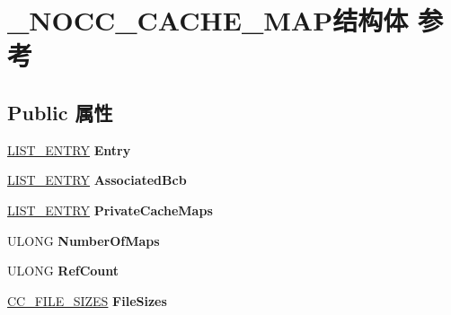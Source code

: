 \hypertarget{struct___n_o_c_c___c_a_c_h_e___m_a_p}{}\section{\+\_\+\+N\+O\+C\+C\+\_\+\+C\+A\+C\+H\+E\+\_\+\+M\+A\+P结构体 参考}
\label{struct___n_o_c_c___c_a_c_h_e___m_a_p}
\subsection*{Public 属性}
\begin{DoxyCompactItemize}
\item 
\mbox{\label{struct___n_o_c_c___c_a_c_h_e___m_a_p_a71ab92a38186544ad79e97781e9ecbda}} 
\hyperlink{struct___l_i_s_t___e_n_t_r_y}{L\+I\+S\+T\+\_\+\+E\+N\+T\+RY} {\bfseries Entry}
\item 
\mbox{\label{struct___n_o_c_c___c_a_c_h_e___m_a_p_af09b1347b81690c13797b5fc41b60cb1}} 
\hyperlink{struct___l_i_s_t___e_n_t_r_y}{L\+I\+S\+T\+\_\+\+E\+N\+T\+RY} {\bfseries Associated\+Bcb}
\item 
\mbox{\label{struct___n_o_c_c___c_a_c_h_e___m_a_p_ac738d2062c4c33e7d63e785c526eaed7}} 
\hyperlink{struct___l_i_s_t___e_n_t_r_y}{L\+I\+S\+T\+\_\+\+E\+N\+T\+RY} {\bfseries Private\+Cache\+Maps}
\item 
\mbox{\label{struct___n_o_c_c___c_a_c_h_e___m_a_p_a1c830813d95c608db8f7bbdaccee0db6}} 
U\+L\+O\+NG {\bfseries Number\+Of\+Maps}
\item 
\mbox{\label{struct___n_o_c_c___c_a_c_h_e___m_a_p_a57a12878226fdd675367fe0488aaa815}} 
U\+L\+O\+NG {\bfseries Ref\+Count}
\item 
\mbox{\label{struct___n_o_c_c___c_a_c_h_e___m_a_p_a9d834db9b3c0f13c934faa1e764ab338}} 
\hyperlink{struct___c_c___f_i_l_e___s_i_z_e_s}{C\+C\+\_\+\+F\+I\+L\+E\+\_\+\+S\+I\+Z\+ES} {\bfseries File\+Sizes}
\item 
\mbox{\label{struct___n_o_c_c___c_a_c_h_e___m_a_p_a2d2c33f0c2863984c5af6f45bcdc9af8}} 

\end{DoxyCompactItemize}
